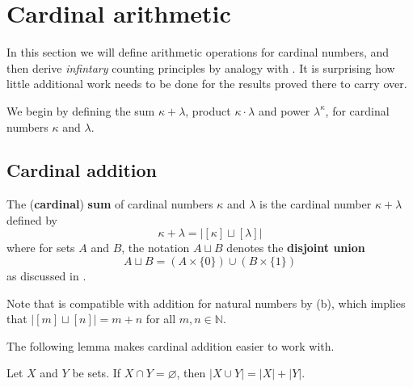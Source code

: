 \section{Cardinal arithmetic}

In this section we will define arithmetic operations for cardinal numbers, and then derive \textit{infintary} counting principles by analogy with . It is surprising how little additional work needs to be done for the results proved there to carry over.

We begin by defining the sum $\kappa + \lambda$, product $\kappa \cdot \lambda$ and power $\lambda^{\kappa}$, for cardinal numbers $\kappa$ and $\lambda$.

\subsection*{Cardinal addition}

\begin{definition}
\label{defCardinalSum}
The (\textbf{cardinal}) \textbf{sum} of cardinal numbers $\kappa$ and $\lambda$ is the cardinal number $\kappa + \lambda$ defined by
\[ \kappa + \lambda = |[\kappa] \sqcup [\lambda]| \]
where for sets $A$ and $B$, the notation $A \sqcup B$ denotes the \textbf{disjoint union}
\[ A \sqcup B = (A \times \{ 0 \}) \cup (B \times \{ 1 \}) \]
as discussed in .
\end{definition}

Note that  is compatible with addition for natural numbers by (b), which implies that $|[m] \sqcup [n]| = m+n$ for all $m,n \in \mathbb{N}$.

The following lemma makes cardinal addition easier to work with.

\begin{lemma}
\label{lemCardinalityOfUnionOfDisjointSets}
Let $X$ and $Y$ be sets. If $X \cap Y = \varnothing$, then $|X \cup Y| = |X| + |Y|$.
\end{lemma}

